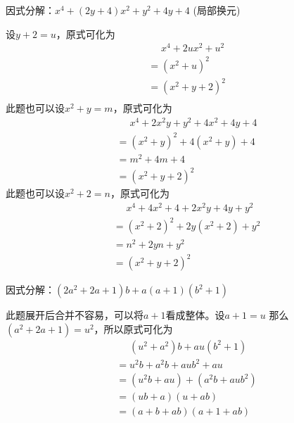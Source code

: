 \documentclass[windows,csize4]{BHCexam}
\begin{document}
\begin{groups}
\begin{questions}[]
        \question[5]因式分解：$x^4+(2y+4)x^2+y^2+4y+4$ (局部换元)
        \begin{solution}{0.5cm}
            \method 设$y+2=u$，原式可化为
            \[
                \begin{aligned}
                     & \phantom{=}x^4+2ux^2+u^2 \\
                     & =(x^2+u)^2               \\
                     & =(x^2+y+2)^2             \\
                \end{aligned}
            \]
            \method 此题也可以设$x^2+y=m$，原式可化为
            \[
                \begin{aligned}
                     & \phantom{=}x^4+2x^2 y+y^2+4x^2+4y+4 \\
                     & =(x^2+y)^2 + 4(x^2+y) +4            \\
                     & =m^2+4m+4                           \\
                     & =(x^2+y+2)^2
                \end{aligned}
            \]
            \method 此题也可以设$x^2+2=n$，原式可化为
            \[
                \begin{aligned}
                     & \phantom{=}x^4+4x^2+4+2x^2 y+4y+y^2 \\
                     & =(x^2+2)^2+2y(x^2+2)+y^2            \\
                     & =n^2+2yn+y^2                        \\
                     & =(x^2+y+2)^2
                \end{aligned}
            \]
        \end{solution}
        \vspace{3.5cm}

        \question[5] 因式分解：$(2a^2+2a+1)b+a(a+1)(b^2+1)$
        \begin{solution}{0.5cm}
            \methodonly 此题展开后合并不容易，可以将$a+1$看成整体。设$a+1=u$
            那么$(a^2+2a+1)=u^2$，所以原式可化为
            \[
                \begin{aligned}
                     & \phantom{=}(u^2+a^2)b+au(b^2+1) \\
                     & =u^2b+a^2b+aub^2+au             \\
                     & =(u^2b+au)+(a^2b+aub^2)          \\
                     & =(ub+a)(u+ab)                   \\
                     & =(a+b+ab)(a+1+ab)
                \end{aligned}
            \]
        \end{solution}
        \vspace{3.5cm}


\end{questions}
\end{groups}
\end{document}
